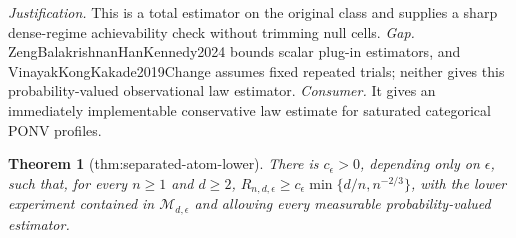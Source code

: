 \documentclass{article}
\newtheorem{theorem}{Theorem}
\begin{document}
\par\smallskip\noindent \textit{Justification.} This is a total estimator on the original class and supplies a sharp dense-regime achievability check without trimming null cells. \textit{Gap.} ZengBalakrishnanHanKennedy2024 bounds scalar plug-in estimators, and VinayakKongKakade2019Change assumes fixed repeated trials; neither gives this probability-valued observational law estimator. \textit{Consumer.} It gives an immediately implementable conservative law estimate for saturated categorical PONV profiles.

\begin{theorem}[thm:separated-atom-lower]\label{thm:separated-atom-lower}
There is \(c_\epsilon>0\), depending only on \(\epsilon\), such that, for every \(n\ge1\) and \(d\ge2\), \(R_{n,d,\epsilon}\ge c_\epsilon\min\{d/n,n^{-2/3}\}\), with the lower experiment contained in \(\mathcal M_{d,\epsilon}\) and allowing every measurable probability-valued estimator.
\end{theorem}
\end{document}
